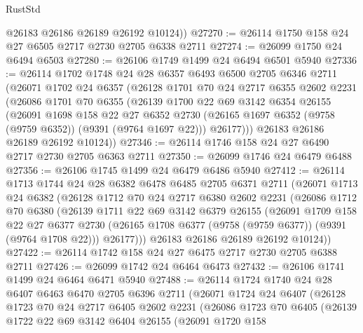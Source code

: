 \begin{lexlean}{RustStd}
\begin{coremodule}
        @26183
        @26186
        @26189
        @26192
        @10124))
@27270 := @26114 @1750 @158 @24 @27 @6505 @2717 @2730 @2705 @6338 @2711
@27274 := @26099 @1750 @24 @6494 @6503
@27280 := @26106 @1749 @1499 @24 @6494 @6501 @5940
@27336 := @26114
    @1702
    @1748
    @24
    @28
    @6357
    @6493
    @6500
    @2705
    @6346
    @2711
    (@26071
      @1702
      @24
      @6357
      (@26128
        @1701
        @70
        @24
        @2717
        @6355
        @2602
        @2231
        (@26086
          @1701
          @70
          @6355
          (@26139
            @1700
            @22
            @69
            @3142
            @6354
            @26155
            (@26091
              @1698
              @158
              @22
              @27
              @6352
              @2730
              (@26165 @1697 @6352 (@9758 (@9759 @6352)) (@9391 (@9764 @1697 @22)))
              @26177)))
        @26183
        @26186
        @26189
        @26192
        @10124))
@27346 := @26114 @1746 @158 @24 @27 @6490 @2717 @2730 @2705 @6363 @2711
@27350 := @26099 @1746 @24 @6479 @6488
@27356 := @26106 @1745 @1499 @24 @6479 @6486 @5940
@27412 := @26114
    @1713
    @1744
    @24
    @28
    @6382
    @6478
    @6485
    @2705
    @6371
    @2711
    (@26071
      @1713
      @24
      @6382
      (@26128
        @1712
        @70
        @24
        @2717
        @6380
        @2602
        @2231
        (@26086
          @1712
          @70
          @6380
          (@26139
            @1711
            @22
            @69
            @3142
            @6379
            @26155
            (@26091
              @1709
              @158
              @22
              @27
              @6377
              @2730
              (@26165 @1708 @6377 (@9758 (@9759 @6377)) (@9391 (@9764 @1708 @22)))
              @26177)))
        @26183
        @26186
        @26189
        @26192
        @10124))
@27422 := @26114 @1742 @158 @24 @27 @6475 @2717 @2730 @2705 @6388 @2711
@27426 := @26099 @1742 @24 @6464 @6473
@27432 := @26106 @1741 @1499 @24 @6464 @6471 @5940
@27488 := @26114
    @1724
    @1740
    @24
    @28
    @6407
    @6463
    @6470
    @2705
    @6396
    @2711
    (@26071
      @1724
      @24
      @6407
      (@26128
        @1723
        @70
        @24
        @2717
        @6405
        @2602
        @2231
        (@26086
          @1723
          @70
          @6405
          (@26139
            @1722
            @22
            @69
            @3142
            @6404
            @26155
            (@26091
              @1720
              @158

\end{coremodule}
\end{lexlean}
